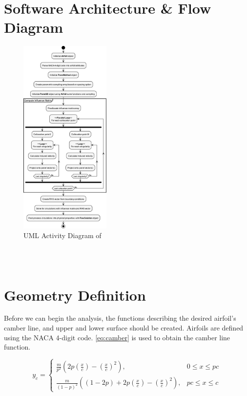 \section{Software Architecture \& Flow Diagram}
\begin{figure}
    \vspace{-2em}
    \begin{center}
      \includegraphics[width=0.40\textwidth]{static/activity_diagram.pdf}
    \end{center}
    \caption{UML Activity Diagram of \numfoil}
    \label{fig:activity}
\end{figure}

\blindtext\\

\blindtext\\

\section{Geometry Definition}
Before we can begin the analysis, the functions describing the desired airfoil's
camber line, and upper and lower surface should be created. Airfoils are defined
using the NACA 4-digit code. \autoref{eq:camber} is used to obtain the camber
line function.

\begin{equation}
\label{eq:camber}
    y_{c}=\left\{
        \begin{array}{ll}
            \frac{m}{p^{2}}\left(2 p\left(\frac{x}{c}\right)-\left(\frac{x}{c}\right)^{2}\right),
            & 0 \leq x \leq p c \\
            \frac{m}{(1-p)^{2}}\left((1-2 p)+2 p\left(\frac{x}{c}\right)-\left(\frac{x}{c}\right)^{2}\right),
            & p c \leq x \leq c
        \end{array}\right.
\end{equation}
\medskip

